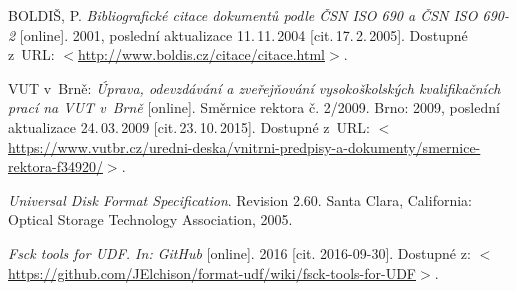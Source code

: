\begin{literatura}{99}
	
    BOLDIŠ, P.
    \emph{Bibliografické citace dokumentů podle ČSN ISO 690 a ČSN ISO 690-2}\/ [online].
    2001, poslední aktualizace 11.\,11.\,2004 [cit.\,17.\,2.\,2005].
    Dostupné z~URL:
    \(<\)\url{http://www.boldis.cz/citace/citace.html}\(>\).

    VUT v~Brně:
    \emph{Úprava, odevzdávání a zveřejňování vysokoškolských kvalifikačních prací na VUT v~Brně}\/ [online]. Směrnice rektora č. 2/2009. Brno: 2009, poslední aktualizace 24.\,03.\,2009 [cit.\,23.\,10.\,2015].
    Dostupné z~URL:
    \(<\)\url{https://www.vutbr.cz/uredni-deska/vnitrni-predpisy-a-dokumenty/smernice-rektora-f34920/}\(>\).

    \emph{Universal Disk Format Specification}. Revision 2.60. Santa Clara, California: Optical Storage Technology Association, 2005.

    \emph{Fsck tools for UDF. In: GitHub}\/ [online]. 2016 [cit. 2016-09-30]. Dostupné z: \(<\)\url{https://github.com/JElchison/format-udf/wiki/fsck-tools-for-UDF}\(>\).  

\end{literatura}
